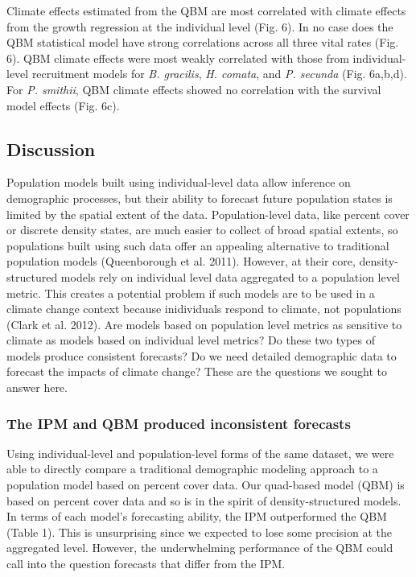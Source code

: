 \documentclass[12pt,]{article}
\begin{document}
Climate effects estimated from the QBM are most correlated with climate
effects from the growth regression at the individual level (Fig. 6). In
no case does the QBM statistical model have strong correlations across
all three vital rates (Fig. 6). QBM climate effects were most weakly
correlated with those from individual-level recruitment models for
\emph{B. gracilis}, \emph{H. comata}, and \emph{P. secunda} (Fig.
6a,b,d). For \emph{P. smithii}, QBM climate effects showed no
correlation with the survival model effects (Fig. 6c).

\subsection{Discussion}\label{discussion}

Population models built using individual-level data allow inference on
demographic processes, but their ability to forecast future population
states is limited by the spatial extent of the data. Population-level
data, like percent cover or discrete density states, are much easier to
collect of broad spatial extents, so populations built using such data
offer an appealing alternative to traditional population models
(Queenborough et al. 2011). However, at their core, density-structured
models rely on individual level data aggregated to a population level
metric. This creates a potential problem if such models are to be used
in a climate change context because inidividuals respond to climate, not
populations (Clark et al. 2012). Are models based on population level
metrics as sensitive to climate as models based on individual level
metrics? Do these two types of models produce consistent forecasts? Do
we need detailed demographic data to forecast the impacts of climate
change? These are the questions we sought to answer here.

\subsubsection{The IPM and QBM produced inconsistent
forecasts}\label{the-ipm-and-qbm-produced-inconsistent-forecasts}

Using individual-level and population-level forms of the same dataset,
we were able to directly compare a traditional demographic modeling
approach to a population model based on percent cover data. Our
quad-based model (QBM) is based on percent cover data and so is in the
spirit of density-structured models. In terms of each model's
forecasting ability, the IPM outperformed the QBM (Table 1). This is
unsurprising since we expected to lose some precision at the aggregated
level. However, the underwhelming performance of the QBM could call into
the question forecasts that differ from the IPM.
\end{document}
